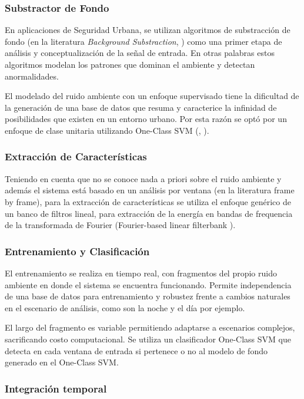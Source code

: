 \documentclass{article}
\begin{document}
\subsubsection{Substractor de Fondo}
En aplicaciones de Seguridad Urbana, se utilizan algoritmos de substracción de fondo (en la literatura \textit{Background Substraction}, \cite{crocco2014audio}) como una primer etapa de análisis y conceptualización de la señal de entrada. En otras palabras estos algoritmos modelan los patrones que dominan el ambiente y detectan anormalidades.
\bigskip 

El modelado del ruido ambiente con un enfoque supervisado tiene la dificultad de la generación de una base de datos que resuma y caracterice la infinidad de posibilidades que existen en un entorno urbano. Por esta razón se optó por un enfoque de clase unitaria utilizando One-Class SVM (\cite{rabaoui2008one}, \citep{lecomte2011abnormal}).

\subsubsection*{Extracción de Características}
Teniendo en cuenta que no se conoce nada a priori sobre el ruido ambiente y además el sistema está basado en un análisis por ventana (en la literatura frame by frame), para la extracción de características se utiliza el enfoque genérico de un banco de filtros lineal, para extracción de la energía en bandas de frequencia de la transformada de Fourier (Fourier-based linear filterbank \citep{lecomte2011abnormal}).

\subsubsection*{Entrenamiento y Clasificación}
El entrenamiento se realiza en tiempo real, con fragmentos del propio ruido ambiente en donde el sistema se encuentra funcionando. Permite independencia de una base de datos para entrenamiento y robustez frente a cambios naturales en el escenario de análisis, como son la noche y el día por ejemplo. 
\bigskip

El largo del fragmento es variable permitiendo adaptarse a escenarios complejos, sacrificando costo computacional. Se utiliza un clasificador One-Class SVM que detecta en cada ventana de entrada si pertenece o no al modelo de fondo generado en el One-Class SVM.

\subsubsection{Integración temporal}
\end{document}
